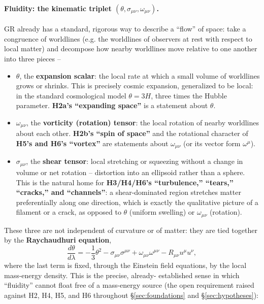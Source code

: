 \documentclass[12pt, a4paper]{article}
\begin{document}
\paragraph{Fluidity: the kinematic triplet $(\theta, \sigma_{\mu\nu},
\omega_{\mu\nu})$.}
GR already has a standard, rigorous way to describe a ``flow'' of
space: take a congruence of worldlines (e.g. the worldlines of
observers at rest with respect to local matter) and decompose how
nearby worldlines move relative to one another into three pieces --
\begin{itemize}
  \item $\theta$, the \textbf{expansion scalar}: the local
    rate at which a small volume of worldlines grows or shrinks.
    This is precisely cosmic expansion, generalized to be local: in
    the standard cosmological model $\theta = 3H$, three times the
    Hubble parameter. \textbf{H2a's ``expanding space''} is a
    statement about $\theta$.
  \item $\omega_{\mu\nu}$, the \textbf{vorticity (rotation) tensor}:
    the local rotation of nearby worldlines about each other.
    \textbf{H2b's ``spin of space''} and the rotational character of
    \textbf{H5's and H6's ``vortex''} are statements about
    $\omega_{\mu\nu}$ (or its vector form $\omega^\mu$).
  \item $\sigma_{\mu\nu}$, the \textbf{shear tensor}: local
    stretching or squeezing without a change in volume or net
    rotation -- distortion into an ellipsoid rather than a sphere.
    This is the natural home for \textbf{H3/H4/H6's ``turbulence,''
    ``tears,'' ``cracks,'' and ``channels''}: a shear-dominated region
    stretches matter preferentially along one direction, which is
    exactly the qualitative picture of a filament or a crack, as
    opposed to $\theta$ (uniform swelling) or $\omega_{\mu\nu}$
    (rotation).
\end{itemize}
These three are not independent of curvature or of matter: they are
tied together by the \textbf{Raychaudhuri equation},
\begin{equation}
\frac{d\theta}{d\lambda} = -\frac{1}{3}\theta^2 -
\sigma_{\mu\nu}\sigma^{\mu\nu} + \omega_{\mu\nu}\omega^{\mu\nu} -
R_{\mu\nu}u^\mu u^\nu,
\end{equation}
where the last term is fixed, through the Einstein field equations,
by the local mass-energy density. This is the precise, already-
established sense in which ``fluidity'' cannot float free of a
mass-energy source (the open requirement raised against H2, H4, H5,
and H6 throughout \S\ref{sec:foundations} and \S\ref{sec:hypotheses}):
\end{document}
